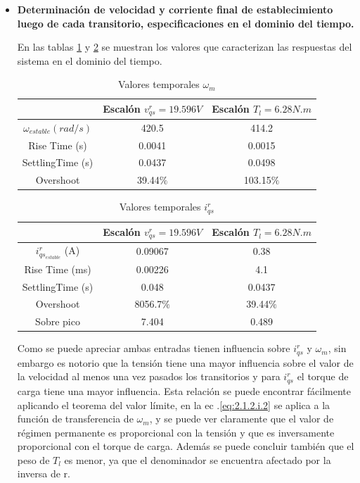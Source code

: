 \documentclass[10pt]{article}
\begin{document}
\begin{itemize}
	\newpage
	\item \textbf{Determinación de velocidad y corriente final de establecimiento luego de cada transitorio, especificaciones en el dominio del tiempo.}
	
	En las tablas \ref{tab:1} y \ref{tab:2} se muestran los valores que caracterizan las respuestas del sistema en el dominio del tiempo.
	\begin{table}[!h]
	\begin{center}
	\begin{tabular}{| c | c | c | }
	\hline
	  & Escalón $v^{r}_{qs}=19.596 V$& Escalón $T_{l}=6.28 N.m$\\ \hline
	 $\omega_{estable} (rad/s)$ &  420.5 &  414.2 \\ \hline
	Rise Time (s) &  0.0041 &  0.0015\\ \hline
	SettlingTime (s)& 0.0437 & 0.0498 \\ \hline
	Overshoot & 39.44$\%$ & 103.15$\%$ \\ \hline
	\end{tabular}
	\caption{Valores temporales $\omega_{m}$}
	\label{tab:1}
	\end{center}
	\end{table}
	
	\begin{table}[!h]
	\begin{center}
	\begin{tabular}{| c | c | c | }
	\hline
	  & Escalón $v^{r}_{qs}=19.596 V$& Escalón $T_{l}=6.28 N.m$\\ \hline
	 $ i^{r}_{qs_{estable}}$  (A) &   0.09067 &  0.38 \\ \hline
	 Rise Time (ms) &  0.00226 &  4.1\\ \hline
	SettlingTime (s)& 0.048 & 0.0437 \\ \hline
	Overshoot & 8056.7$\%$ & 39.44$\%$ \\ \hline
	Sobre pico & 7.404 & 0.489 \\ \hline
	\end{tabular}
	\caption{Valores temporales $i^{r}_{qs}$}
	\label{tab:2}
	\end{center}
	\end{table}
	
	Como se puede apreciar ambas entradas tienen influencia sobre $ i^{r}_{qs}$ y $\omega_{m}$, sin embargo es notorio que la tensión tiene una mayor influencia sobre el valor de la velocidad al menos una vez pasados los transitorios y para $ i^{r}_{qs}$ el torque de carga tiene una mayor influencia. Esta relación se puede encontrar fácilmente aplicando el teorema del valor límite, en la ec .\ref{eq:2.1.2.i.2} se aplica a la función de transferencia de $\omega_{m}$, y se puede ver claramente que el valor de régimen permanente es proporcional con la tensión y que es inversamente proporcional con el torque de carga. Además se puede concluir también que el peso de $T_{l}$ es menor, ya que el denominador se encuentra afectado por la inversa de r.
	

\end{itemize}
\end{document}
